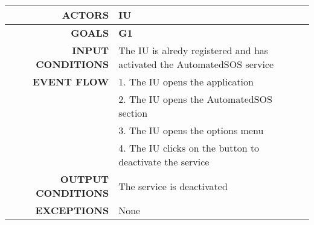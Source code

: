 \begin{table}[h!]
\begin{tabular}{|r|p{3in}|}
\hline
\textbf{ACTORS} & IU\\
\hline
\textbf{GOALS} & \textbf{G1} \\
\hline
\textbf{INPUT CONDITIONS} & The IU is alredy registered and has activated the AutomatedSOS service \\
\hline
\textbf{EVENT FLOW} 
&1. The IU opens the application \\
&2. The IU opens the AutomatedSOS section\\
&3. The IU opens the options menu\\
&4. The IU clicks on the button to deactivate the service \\
\hline
\textbf{OUTPUT CONDITIONS} & The service is deactivated  \\
\hline
\textbf{EXCEPTIONS} 
& None \\
\hline
\end{tabular}
\end{table}